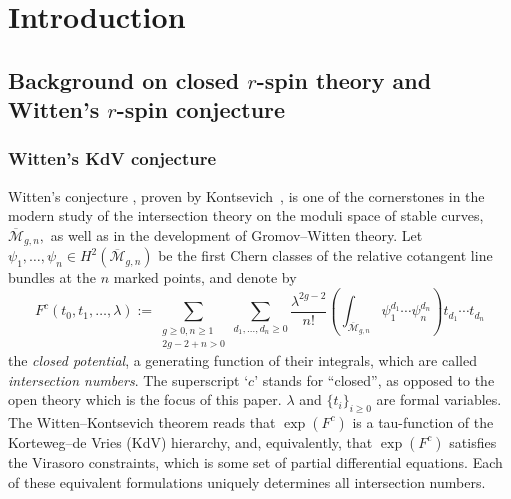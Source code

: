 \documentclass[11pt]{amsart}
\theoremstyle{definition}
\theoremstyle{remark}
\newcommand{\<}{\left<}
\renewcommand{\>}{\right>}
\numberwithin{equation}{section}
\def\Mbar{{\overline{\mathcal M}}}
\begin{document}
\maketitle

\setcounter{tocdepth}{1}
\tableofcontents

\section{Introduction}\label{sec intro}
\subsection{Background on closed $r$-spin theory and Witten's $r$-spin conjecture}
\subsubsection{Witten's KdV conjecture}
Witten's conjecture \cite{Witten2DGravity}, proven by Kontsevich~\cite{Kontsevich}, is one of the cornerstones in the modern study of the intersection theory on the moduli space of %
stable curves,~$\Mbar_{g,n},$ %
as well as in the development of Gromov--Witten theory. Let $\psi_1, \ldots, \psi_n \in H^2(\Mbar_{g,n})$ be the first Chern classes of the relative cotangent line bundles at the $n$ marked points, and denote by
\[
F^c(t_0,t_1,\ldots,\lambda) := \sum_{\substack{g \geq 0, n\geq 1\\2g-2+n>0}} \sum_{d_1,\ldots,d_n\geq 0} \frac{\lambda^{2g-2}}{n!}\left(\int_{\Mbar_{g,n}} \psi_1^{d_1} \cdots \psi_n^{d_n} \right)t_{d_1} \cdots t_{d_n}
\]
the \emph{closed potential}, a generating function of their integrals, which are called \emph{intersection numbers}. The superscript `$c$' stands %
for ``closed'', as %
opposed to the open theory which is the focus of this paper.  $\lambda$ and $\{t_i\}_{i\ge 0}$  are formal variables.  The Witten--Kontsevich theorem reads that $\exp(F^c)$ is a tau-function of the Korteweg--de Vries (KdV) %
hierarchy, and, equivalently, that %
$\exp(F^c)$ satisfies the Virasoro constraints, which is some set of partial differential equations. Each of these equivalent formulations uniquely determines all intersection numbers.
\end{document}
